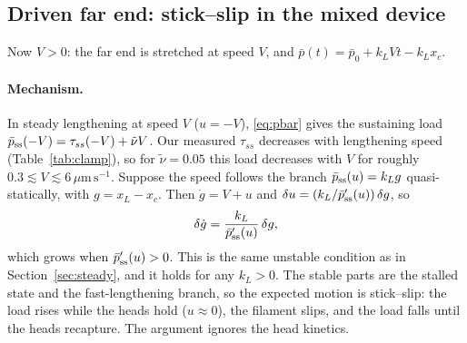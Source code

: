 \documentclass[11pt,a4paper]{article}
\newcommand{\umps}{\,\mu\mathrm{m\,s^{-1}}}
\newcommand{\pss}{\bar p_{\rm ss}}
\begin{document}
\subsection{Driven far end: stick--slip in the mixed device}
Now $V>0$: the far end is stretched at speed $V$, and $\bar p(t)=\bar p_0+k_LVt-k_Lx_c$.

\paragraph{Mechanism.} In steady lengthening at speed $V$ ($u=-V$), \eqref{eq:pbar} gives the sustaining load $\pss(-V)=\tau_{ss}(-V)+\tilde\nu V$. Our measured $\tau_{ss}$ decreases with lengthening speed (Table~\ref{tab:clamp}), so for $\tilde\nu=0.05$ this load decreases with $V$ for roughly $0.3\lesssim V\lesssim6\umps$. Suppose the speed follows the branch $\pss(u)=k_Lg$ quasi-statically, with $g=x_L-x_c$. Then $\dot g=V+u$ and $\delta u=(k_L/\pss'(u))\,\delta g$, so
\begin{equation}
\delta\dot g=\frac{k_L}{\pss'(u)}\,\delta g,
\end{equation}
which grows when $\pss'(u)>0$. This is the same unstable condition as in Section~\ref{sec:steady}, and it holds for any $k_L>0$. The stable parts are the stalled state and the fast-lengthening branch, so the expected motion is stick--slip: the load rises while the heads hold ($u\approx0$), the filament slips, and the load falls until the heads recapture. The argument ignores the head kinetics.
\end{document}
